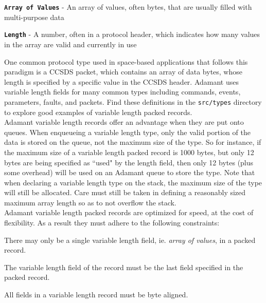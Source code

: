 \vspace{5mm} %
\begin{spaceditemize}
  \item \textbf{\texttt{Array of Values}} - An array of values, often bytes, that are usually filled with multi-purpose data
  \item \textbf{\texttt{Length}} - A number, often in a protocol header, which indicates how many values in the array are valid and currently in use
\end{spaceditemize}
\vspace{5mm} %

One common protocol type used in space-based applications that follows this paradigm is a CCSDS packet, which contains an array of data bytes, whose length is specified by a specific value in the CCSDS header. Adamant uses variable length fields for many common types including commands, events, parameters, faults, and packets. Find these definitions in the \texttt{src/types} directory to explore good examples of variable length packed records. \\

Adamant variable length records offer an advantage when they are put onto queues. When enqueueing a variable length type, only the valid portion of the data is stored on the queue, not the maximum size of the type. So for instance, if the maximum size of a variable length packed record is 1000 bytes, but only 12 bytes are being specified as ``used" by the length field, then only 12 bytes (plus some overhead) will be used on an Adamant queue to store the type. Note that when declaring a variable length type on the stack, the maximum size of the type will still be allocated. Care must still be taken in defining a reasonably sized maximum array length so as to not overflow the stack. \\

Adamant variable length packed records are optimized for speed, at the cost of flexibility. As a result they must adhere to the following constraints:

\vspace{5mm} %
\begin{spacedenumerate}
  \item There may only be a single variable length field, ie. \textit{array of values}, in a packed record.
  \item The variable length field of the record must be the last field specified in the packed record.
  \item All fields in a variable length record must be byte aligned. 
\end{spacedenumerate}
\vspace{5mm} %

